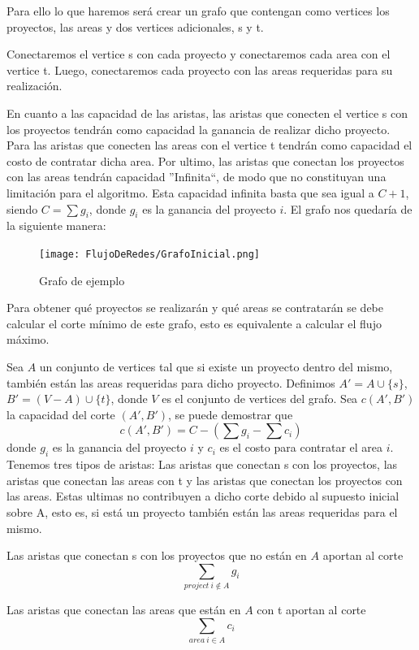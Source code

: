 Para ello lo que haremos será crear un grafo que contengan como vertices los proyectos, las areas y dos vertices adicionales, s y t.

Conectaremos el vertice s con cada proyecto y conectaremos cada area con el vertice t.
Luego, conectaremos cada proyecto con las areas requeridas para su realización.

En cuanto a las capacidad de las aristas, las aristas que conecten el vertice s con los proyectos tendrán como capacidad la ganancia de realizar dicho proyecto. Para las aristas que conecten las areas 
con el vertice t tendrán como capacidad el costo de contratar dicha area. Por ultimo, las aristas que conectan los proyectos con las areas tendrán capacidad ''Infinita``, de modo que no constituyan 
una limitación para el algoritmo. Esta capacidad infinita basta que sea igual a $ C + 1 $, siendo $ C = \sum g_i $, donde $g_i$ es la ganancia del proyecto $i$.
\newpage
El grafo nos quedaría de la siguiente manera:

\begin{figure}[H]
\centering
\texttt{[image: FlujoDeRedes/GrafoInicial.png]}
\caption{Grafo de ejemplo}
\end{figure}

Para obtener qué proyectos se realizarán y qué areas se contratarán se debe calcular el corte mínimo de este grafo, esto es equivalente a calcular el flujo máximo. 


Sea $A$ un conjunto de vertices tal que si existe un proyecto dentro del mismo, también están las areas requeridas para dicho proyecto.
Definimos $A' = A \cup \{s\}$, $B' = (V - A) \cup \{t\}$, donde $V$ es el conjunto de vertices del grafo.
Sea $c(A',B')$ la capacidad del corte $(A',B')$, se puede demostrar que 
$$c(A', B') = C - \left(\sum g_i - \sum c_i\right)$$
donde $g_i$ es la ganancia del proyecto $i$ y $c_i$ es el costo para contratar el area $i$.
Tenemos tres tipos de aristas: Las aristas que conectan s con los proyectos, las aristas que conectan las areas con t y las aristas que conectan los proyectos con las areas.
Estas ultimas no contribuyen a dicho corte debido al supuesto inicial sobre A, esto es, si está un proyecto también están las areas requeridas para el mismo.

Las aristas que conectan s con los proyectos que no están en $A$ aportan al corte
$$ \sum_{project\ i \notin A} g_i $$

Las aristas que conectan las areas que están en $A$ con t aportan al corte
$$ \sum_{area\ i \in A} c_i $$

